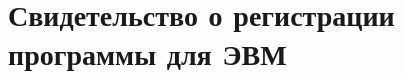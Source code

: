 \chapter{Свидетельство о регистрации программы для ЭВМ}\label{app:A}

\begin{figure}[ht]
	\caption[Свидетельство о государственной регистрации программы для ЭВМ №2019619998.]{}\label{fig:rid}
\end{figure}